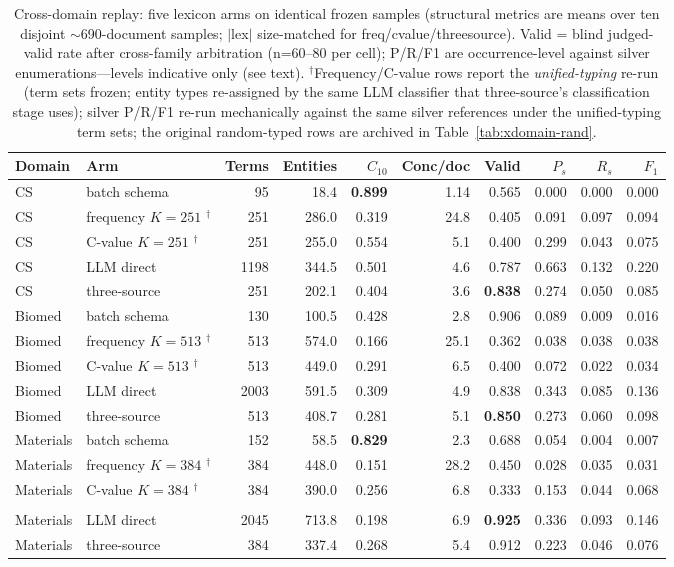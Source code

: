 \documentclass[preprint,12pt]{elsarticle}
\begin{document}
\begin{table}[t]
\centering
\caption{Cross-domain replay: five lexicon arms on identical frozen
samples (structural metrics are means over ten disjoint
${\sim}$690-document samples; $|$lex$|$ size-matched for
freq/cvalue/threesource). Valid = blind judged-valid rate after
cross-family arbitration (n=60--80 per cell); P/R/F1 are
occurrence-level against silver enumerations---levels indicative only
(see text). $^{\dagger}$Frequency/C-value rows report the
\emph{unified-typing} re-run (term sets frozen; entity types
re-assigned by the same LLM classifier that three-source's
classification stage uses); silver P/R/F1 re-run mechanically against
the same silver references under the unified-typing term sets; the
original random-typed rows are archived in
Table~\ref{tab:xdomain-rand}.}
\label{tab:xdomain}
\small
\begin{tabular}{@{}llrrrrrrrr@{}}
\toprule
Domain & Arm & Terms & Entities & $C_{10}$ & Conc/doc & Valid & $P_{s}$ & $R_{s}$ & $F_1$ \\
\midrule
CS & batch schema & 95 & 18.4 & \textbf{0.899} & 1.14 & 0.565 & 0.000 & 0.000 & 0.000 \\
CS & frequency $K{=}251$ $^{\dagger}$ & 251 & 286.0 & 0.319 & 24.8 & 0.405 & 0.091 & 0.097 & 0.094 \\
CS & C-value $K{=}251$ $^{\dagger}$ & 251 & 255.0 & 0.554 & 5.1 & 0.400 & 0.299 & 0.043 & 0.075 \\
CS & LLM direct & 1198 & 344.5 & 0.501 & 4.6 & 0.787 & 0.663 & 0.132 & 0.220 \\
CS & three-source & 251 & 202.1 & 0.404 & 3.6 & \textbf{0.838} & 0.274 & 0.050 & 0.085 \\
\midrule
Biomed & batch schema & 130 & 100.5 & 0.428 & 2.8 & 0.906 & 0.089 & 0.009 & 0.016 \\
Biomed & frequency $K{=}513$ $^{\dagger}$ & 513 & 574.0 & 0.166 & 25.1 & 0.362 & 0.038 & 0.038 & 0.038 \\
Biomed & C-value $K{=}513$ $^{\dagger}$ & 513 & 449.0 & 0.291 & 6.5 & 0.400 & 0.072 & 0.022 & 0.034 \\
Biomed & LLM direct & 2003 & 591.5 & 0.309 & 4.9 & 0.838 & 0.343 & 0.085 & 0.136 \\
Biomed & three-source & 513 & 408.7 & 0.281 & 5.1 & \textbf{0.850} & 0.273 & 0.060 & 0.098 \\
\midrule
Materials & batch schema & 152 & 58.5 & \textbf{0.829} & 2.3 & 0.688 & 0.054 & 0.004 & 0.007 \\
Materials & frequency $K{=}384$ $^{\dagger}$ & 384 & 448.0 & 0.151 & 28.2 & 0.450 & 0.028 & 0.035 & 0.031 \\
Materials & C-value $K{=}384$ $^{\dagger}$ & 384 & 390.0 & 0.256 & 6.8 & 0.333 & 0.153 & 0.044 & 0.068 \\\\
Materials & LLM direct & 2045 & 713.8 & 0.198 & 6.9 & \textbf{0.925} & 0.336 & 0.093 & 0.146 \\
Materials & three-source & 384 & 337.4 & 0.268 & 5.4 & 0.912 & 0.223 & 0.046 & 0.076 \\
\bottomrule
\end{tabular}
\end{table}
\end{document}
